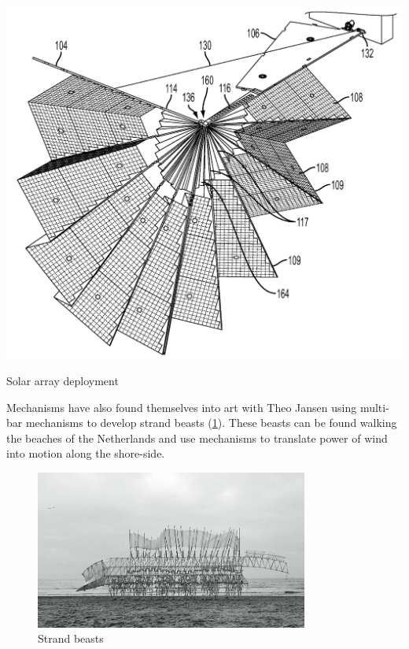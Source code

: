 \begin{marginfigure}
  \centering
  \includegraphics[width=\textwidth]{figs/solar-arrays.png}
  \caption{Solar array deployment}
  \label{fig-solar}
\end{marginfigure}


Mechanisms  have also found themselves into art with Theo Jansen using multi-bar mechanisms to develop strand beasts (\cref{fig-strand}). These beasts can be found walking the beaches of the Netherlands and use mechanisms to translate power of wind into motion along the shore-side.

\begin{figure}[h!]
  \centering
  \includegraphics[width=0.8\textwidth]{figs/strand-beast.jpg}
  \caption{Strand beasts}
  \label{fig-strand}
\end{figure}

